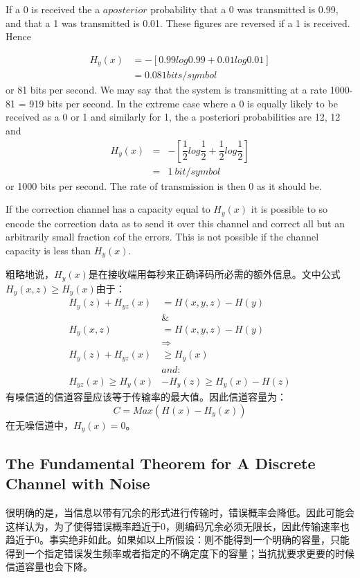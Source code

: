 \documentclass[conference]{IEEEtran}
\begin{document}
If a 0 is received the a $a posterior$ probability that a 0 was
transmitted is 0.99, and that a 1 was transmitted is 0.01. These
figures are reversed if a 1 is received. Hence

\begin{align*}
	H_{y}(x) & = -[0.99log0.99 + 0.01log0.01] \\
	         & =0.081 bits/symbol
\end{align*} or 81 bits per second. We may say that the system is transmitting at a rate 1000-81 = 919 bits per second. In the extreme case where a 0 is equally likely to be received as a 0 or 1 and similarly for 1, the a posteriori probabilities are 12, 12 and
\begin{eqnarray*}
	H_{y}(x) &=& -[\dfrac{1}{2}log\dfrac{1}{2}+\dfrac{1}{2}log\dfrac{1}{2}]\\
			 &=& 1\ bit/symbol
\end{eqnarray*} or 1000 bits per second. The rate of transmission is then 0 as it should be.

\begin{theorem}
	If the correction channel has a capacity equal to  $H_{y}(x)$ it is possible to so encode the correction data as to send it over this channel and correct all but an arbitrarily small fraction $\epsilon$of the errors. This is not possible if the channel capacity is less than $H_{y}(x)$.
\end{theorem}
粗略地说，$ H_{y}(x) $是在接收端用每秒来正确译码所必需的额外信息。文中公式$ H_{y}(x,z)\geq H_{y}(x)$由于：
\begin{align*}
	H_{y}(z)+H_{yz}(x)     & = H(x,y,z)-H(y)              \\
	                       & \&\ \ \ \ \ \ \              \\
	H_{y}(x,z)             & = H(x,y,z)-H(y)              \\
	                       & \Rightarrow                  \\
	H_{y}(z)+H_{yz}(x)     & \geq H_{y}(x)                \\
	                       & and :                        \\
	H_{yz}(x)\geq H_{y}(x) & -H_{y}(z) \geq H_{y}(x)-H(z)
\end{align*}
有噪信道的信道容量应该等于传输率的最大值。因此信道容量为：
\[
C=Max(H(x)-H_{y}(x))
\]
在无噪信道中，$H_{y}(x)=0$。

\subsection{The Fundamental Theorem for A Discrete Channel with Noise}
很明确的是，当信息以带有冗余的形式进行传输时，错误概率会降低。因此可能会这样认为，为了使得错误概率趋近于0，则编码冗余必须无限长，因此传输速率也趋近于0。事实绝非如此。如果如以上所假设：则不能得到一个明确的容量，只能得到一个指定错误发生频率或者指定的不确定度下的容量；当抗扰要求更要的时候信道容量也会下降。
\end{document}

